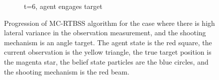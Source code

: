 \begin{figure}
\begin{subfigure}[b]{0.3\textwidth}
                \caption{t=6, agent engages target}
                \label{fig:beam_bad_heading_t_6}
        \end{subfigure}
        \caption{Progression of MC-RTBSS algorithm for the case where there is high lateral variance in the observation measurement, and the shooting mechanism is an angle target. The agent state is the red square, the current observation is the yellow triangle, the true target position is the magenta star, the belief state particles are the blue circles, and the shooting mechanism is the red beam.}\label{fig:beam_bad_heading}
\end{figure}